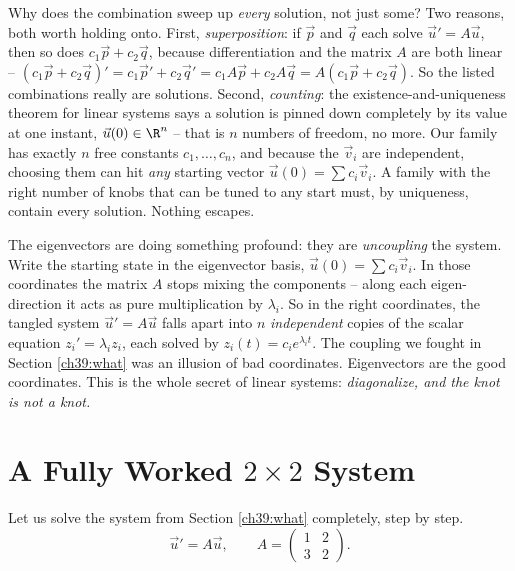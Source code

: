 \begin{whybox}
Why does the combination sweep up \emph{every} solution, not just some? Two
reasons, both worth holding onto. First, \emph{superposition}: if $\vec p$ and
$\vec q$ each solve $\vec u' = A\vec u$, then so does $c_1\vec p + c_2\vec q$,
because differentiation and the matrix $A$ are both linear --
$(c_1\vec p + c_2\vec q)' = c_1\vec p' + c_2\vec q' = c_1 A\vec p + c_2 A\vec q =
A(c_1\vec p + c_2\vec q)$. So the listed combinations really are solutions.
Second, \emph{counting}: the existence-and-uniqueness theorem for linear systems
says a solution is pinned down completely by its value at one instant, $\vec
u(0)\in\R^n$ -- that is $n$ numbers of freedom, no more. Our family has exactly
$n$ free constants $c_1,\dots,c_n$, and because the $\vec v_i$ are independent,
choosing them can hit \emph{any} starting vector $\vec u(0) = \sum c_i\vec v_i$.
A family with the right number of knobs that can be tuned to any start must, by
uniqueness, contain every solution. Nothing escapes.
\end{whybox}

\begin{happeningbox}
The eigenvectors are doing something profound: they are \emph{uncoupling} the
system. Write the starting state in the eigenvector basis, $\vec u(0) = \sum c_i
\vec v_i$. In those coordinates the matrix $A$ stops mixing the components --
along each eigen-direction it acts as pure multiplication by $\lambda_i$. So in
the right coordinates, the tangled system $\vec u' = A\vec u$ falls apart into
$n$ \emph{independent} copies of the scalar equation $z_i' = \lambda_i z_i$, each
solved by $z_i(t) = c_i e^{\lambda_i t}$. The coupling we fought in Section
\ref{ch39:what} was an illusion of bad coordinates. Eigenvectors are the good
coordinates. This is the whole secret of linear systems: \emph{diagonalize, and
the knot is not a knot.}
\end{happeningbox}

\section{A Fully Worked $2\times2$ System}
\label{ch39:worked}

Let us solve the system from Section \ref{ch39:what} completely, step by step.
\[
  \vec u' = A\vec u, \qquad
  A = \begin{pmatrix} 1 & 2 \\ 3 & 2 \end{pmatrix}.
\]

